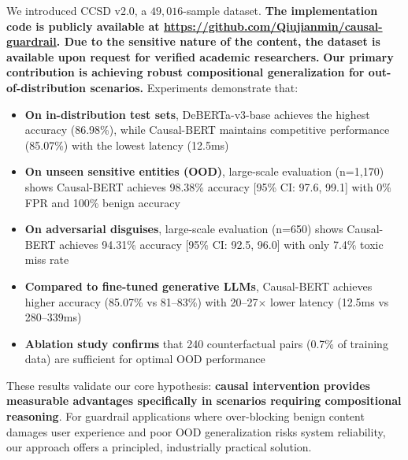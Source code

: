 \documentclass{acmart}
\begin{document}
We introduced CCSD v2.0, a $49,016$-sample dataset. \textbf{The implementation code is publicly available at \url{https://github.com/Qiujianmin/causal-guardrail}. Due to the sensitive nature of the content, the dataset is available upon request for verified academic researchers.} \textbf{Our primary contribution is achieving robust compositional generalization for out-of-distribution scenarios.} Experiments demonstrate that:
\begin{itemize}
\item \textbf{On in-distribution test sets}, DeBERTa-v3-base achieves the highest accuracy (86.98\%), while Causal-BERT maintains competitive performance (85.07\%) with the lowest latency (12.5ms)
\item \textbf{On unseen sensitive entities (OOD)}, large-scale evaluation (n=1,170) shows Causal-BERT achieves 98.38\% accuracy [95\% CI: 97.6, 99.1] with 0\% FPR and 100\% benign accuracy
\item \textbf{On adversarial disguises}, large-scale evaluation (n=650) shows Causal-BERT achieves 94.31\% accuracy [95\% CI: 92.5, 96.0] with only 7.4\% toxic miss rate
\item \textbf{Compared to fine-tuned generative LLMs}, Causal-BERT achieves higher accuracy (85.07\% vs 81--83\%) with 20--27$\times$ lower latency (12.5ms vs 280--339ms)
\item \textbf{Ablation study confirms} that 240 counterfactual pairs (0.7\% of training data) are sufficient for optimal OOD performance
\end{itemize}

These results validate our core hypothesis: \textbf{causal intervention provides measurable advantages specifically in scenarios requiring compositional reasoning}. For guardrail applications where over-blocking benign content damages user experience and poor OOD generalization risks system reliability, our approach offers a principled, industrially practical solution.
\end{document}
